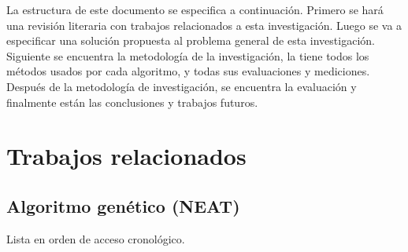 \documentclass{article}
\begin{document}
La estructura de este documento se especifica a continuación. Primero se hará una revisión literaria con trabajos relacionados a esta investigación. Luego se va a especificar una solución propuesta al problema general de esta investigación. Siguiente se encuentra la metodología de la investigación, la tiene todos los métodos usados por cada algoritmo, y todas sus evaluaciones y mediciones. Después de la metodología de investigación, se encuentra la evaluación y finalmente están las conclusiones y trabajos futuros.




\section{Trabajos relacionados}
\subsection{Algoritmo genético (NEAT)}
Lista en orden de acceso cronológico.
\end{document}

